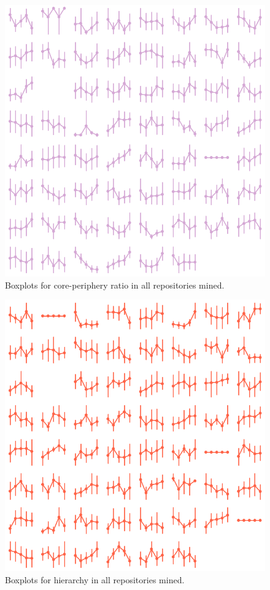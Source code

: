 \begin{appendices}
    \begin{figure}[!htb]
        \centering
        \includegraphics[width=\textwidth]{figures/quantitative/pointplots/cp_ratio_all.png}
        \caption{Boxplots for core-periphery ratio in all repositories mined.}
    \end{figure}

    \begin{figure}[!htb]
        \centering
        \includegraphics[width=\textwidth]{figures/quantitative/pointplots/hierarchy_all.png}
        \caption{Boxplots for hierarchy in all repositories mined.}
    \end{figure}

\end{appendices}
